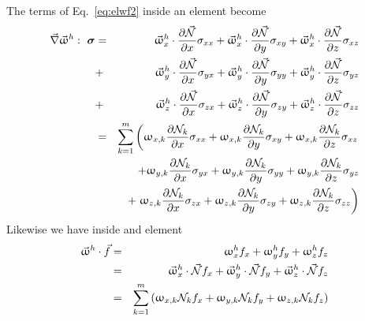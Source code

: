 The terms of Eq.~\eqref{eq:elwf2} inside an element become
\begin{eqnarray}
\vec\nabla \vec{\upomega}^h :\ {\bm \sigma}  
&=& 
\vec{\upomega}_x^h \cdot\frac{\partial \vec{{\mathcal{N}}}}{\partial x} \sigma_{xx} +
\vec{\upomega}_x^h \cdot\frac{\partial \vec{{\mathcal{N}}}}{\partial y} \sigma_{xy} +
\vec{\upomega}_x^h \cdot\frac{\partial \vec{{\mathcal{N}}}}{\partial z} \sigma_{xz} \nonumber\\
&+& 
\vec{\upomega}_y^h \cdot \frac{\partial \vec{{\mathcal{N}}}}{\partial x} \sigma_{yx} +
\vec{\upomega}_y^h \cdot \frac{\partial \vec{{\mathcal{N}}}}{\partial y} \sigma_{yy} +
\vec{\upomega}_y^h \cdot \frac{\partial \vec{{\mathcal{N}}}}{\partial z} \sigma_{yz} \nonumber\\
&+& 
\vec{\upomega}_z^h \cdot \frac{\partial \vec{{\mathcal{N}}}}{\partial x} \sigma_{zx} +
\vec{\upomega}_z^h \cdot \frac{\partial \vec{{\mathcal{N}}}}{\partial y} \sigma_{zy} +
\vec{\upomega}_z^h \cdot \frac{\partial \vec{{\mathcal{N}}}}{\partial z} \sigma_{zz} \nonumber\\
&=& 
\sum_{k=1}^m  
\left(
{\upomega}_{x,k} \frac{\partial {{\mathcal{N}}}_k}{\partial x} \sigma_{xx} +
{\upomega}_{x,k} \frac{\partial {{\mathcal{N}}}_k}{\partial y} \sigma_{xy} +
{\upomega}_{x,k} \frac{\partial {{\mathcal{N}}}_k}{\partial z} \sigma_{xz} 
\right. \nonumber\\
&&+
{\upomega}_{y,k} \frac{\partial {{\mathcal{N}}}_k}{\partial x} \sigma_{yx} +
{\upomega}_{y,k} \frac{\partial {{\mathcal{N}}}_k}{\partial y} \sigma_{yy} +
{\upomega}_{y,k} \frac{\partial {{\mathcal{N}}}_k}{\partial z} \sigma_{yz} \nonumber\\
&&+
\left.
{\upomega}_{z,k} \frac{\partial {{\mathcal{N}}}_k}{\partial x} \sigma_{zx} +
{\upomega}_{z,k} \frac{\partial {{\mathcal{N}}}_k}{\partial y} \sigma_{zy} +
{\upomega}_{z,k} \frac{\partial {{\mathcal{N}}}_k}{\partial z} \sigma_{zz} \right)
\label{eq:el:alf}
\end{eqnarray}
Likewise we have inside and element
\begin{eqnarray}
\vec\upomega^h \cdot \vec{f} 
&=& 
\upomega_x^h f_x + 
\upomega_y^h f_y + 
\upomega_z^h f_z  \nonumber\\
&=&
\vec{\upomega}_x^h \cdot \vec{{\mathcal{N}}}  f_x +
\vec{\upomega}_y^h \cdot \vec{{\mathcal{N}}}  f_y +
\vec{\upomega}_z^h \cdot \vec{{\mathcal{N}}}  f_z  \nonumber\\
&=& 
\sum_{k=1}^m  
\left(
{\upomega}_{x,k}  {{\mathcal{N}}}_k  f_x +
{\upomega}_{y,k}  {{\mathcal{N}}}_k  f_y +
{\upomega}_{z,k}  {{\mathcal{N}}}_k  f_z  
\right)
\label{eq:el:heidi}
\end{eqnarray}

